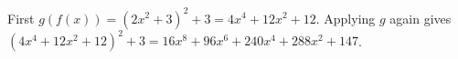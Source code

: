First $g(f(x))=(2x^2+3)^2+3=4x^4+12x^2+12$. Applying $g$ again gives $(4x^4+12x^2+12)^2+3=\boxed{16x^8+96x^6+240x^4+288x^2+147}$.
